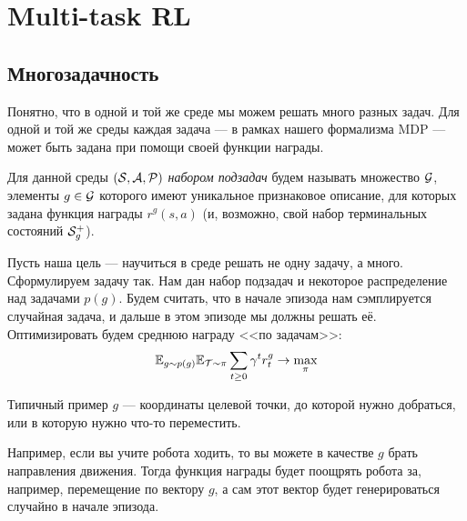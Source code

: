 \section{Multi-task RL}\label{sec:multitask}

\subsection{Многозадачность}

Понятно, что в одной и той же среде мы можем решать много разных задач. Для одной и той же среды каждая задача --- в рамках нашего формализма MDP --- может быть задана при помощи своей функции награды.

\begin{definition}
Для данной среды $(\mathcal{S}, \mathcal{A}, \mathcal{P})$ \emph{набором подзадач} будем называть множество $\mathcal{G}$, элементы $g \in \mathcal{G}$ которого имеют уникальное признаковое описание, для которых задана функция награды $r^g(s, a)$ (и, возможно, свой набор терминальных состояний $\mathcal{S}^+_g$).
\end{definition}

Пусть наша цель --- научиться в среде решать не одну задачу, а много. Сформулируем задачу так. Нам дан набор подзадач и некоторое распределение над задачами $p(g)$. Будем считать, что в начале эпизода нам сэмплируется случайная задача, и дальше в этом эпизоде мы должны решать её. Оптимизировать будем среднюю награду <<по задачам>>:
\begin{equation}\label{multitask}
\mathbb{E}_{g \sim p(g)} \mathbb{E}_{\mathcal{T} \sim \pi} \sum_{t \ge 0}\gamma^t r^g_t \to \max_{\pi}
\end{equation}

\begin{example}
Типичный пример $g$ --- координаты целевой точки, до которой нужно добраться, или в которую нужно что-то переместить.
\end{example}

\begin{example}
Например, если вы учите робота ходить, то вы можете в качестве $g$ брать направления движения. Тогда функция награды будет поощрять робота за, например, перемещение по вектору $g$, а сам этот вектор будет генерироваться случайно в начале эпизода.
\end{example}


